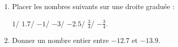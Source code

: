 
\begin{exercice}\label{exo2smath-0253}

    \begin{enumerate}
        \item
            Placer les nombres suivants sur une droite graduée :
            
            \( 1\)/ \( 1.7\)/ \( -1\)/ \( -3\)/ \( -2.5\)/ \( \frac{ 3 }{ 4 }\)/ \( -\frac{ 3 }{ 4 }\).
        \item
            Donner un nombre entier entre \( -12.7\) et \( -13.9\).
    \end{enumerate}

\end{exercice}
